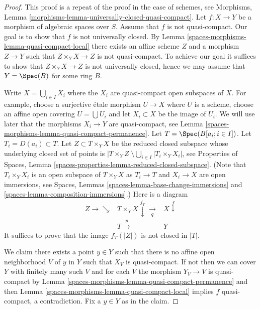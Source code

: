 \begin{proof}
This proof is a repeat of the proof in the case of schemes, see
Morphisms, Lemma \ref{morphisms-lemma-universally-closed-quasi-compact}.
Let $f : X \to Y$ be a morphism of algebraic spaces over $S$.
Assume that $f$ is not quasi-compact.
Our goal is to show that $f$ is not universally closed. By
Lemma \ref{spaces-morphisms-lemma-quasi-compact-local}
there exists an affine scheme $Z$ and a morphism $Z \to Y$
such that $Z \times_Y X \to Z$ is not quasi-compact. To achieve our goal
it suffices to show that $Z \times_Y X \to Z$ is not universally closed,
hence we may assume that $Y = \Spec(B)$ for some ring $B$.

\medskip\noindent
Write $X = \bigcup_{i \in I} X_i$ where the $X_i$ are quasi-compact
open subspaces of $X$. For example, choose a surjective \'etale morphism
$U \to X$ where $U$ is a scheme, choose an affine open covering
$U = \bigcup U_i$ and let $X_i \subset X$ be the image of $U_i$.
We will use later that the morphisms $X_i \to Y$ are quasi-compact, see
Lemma \ref{spaces-morphisms-lemma-quasi-compact-permanence}.
Let $T = \Spec(B[a_i ; i \in I])$. Let $T_i = D(a_i) \subset T$.
Let $Z \subset T \times_Y X$ be the reduced closed subspace whose underlying
closed set of points is
$|T \times_Y Z| \setminus \bigcup_{i \in I} |T_i \times_Y X_i|$, see
Properties of Spaces,
Lemma \ref{spaces-properties-lemma-reduced-closed-subspace}.
(Note that $T_i \times_Y X_i$ is an open subspace of $T \times_Y X$ as
$T_i \to T$ and $X_i \to X$ are open immersions, see
Spaces, Lemmas \ref{spaces-lemma-base-change-immersions} and
\ref{spaces-lemma-composition-immersions}.) Here is a diagram
$$
\begin{array}{ccc}Z \longrightarrow\searrow & T \times_Y X \overset{f_T}{\downarrow}\underset{q}{\longrightarrow} & X \overset{f}{\downarrow} \\  & T \overset{p}{\longrightarrow} & Y\end{array}
$$
It suffices to prove that the image $f_T(|Z|)$ is not closed in $|T|$.

\medskip\noindent
We claim there exists a point $y \in Y$ such that there is no
affine open neighborhood $V$ of $y$ in $Y$ such that $X_V$ is quasi-compact.
If not then we can cover $Y$ with finitely many such $V$ and for
each $V$ the morphism $Y_V \to V$ is quasi-compact by
Lemma \ref{spaces-morphisms-lemma-quasi-compact-permanence}
and then
Lemma \ref{spaces-morphisms-lemma-quasi-compact-local}
implies $f$ quasi-compact, a contradiction. Fix a $y \in Y$ as in the claim.


\end{proof}
